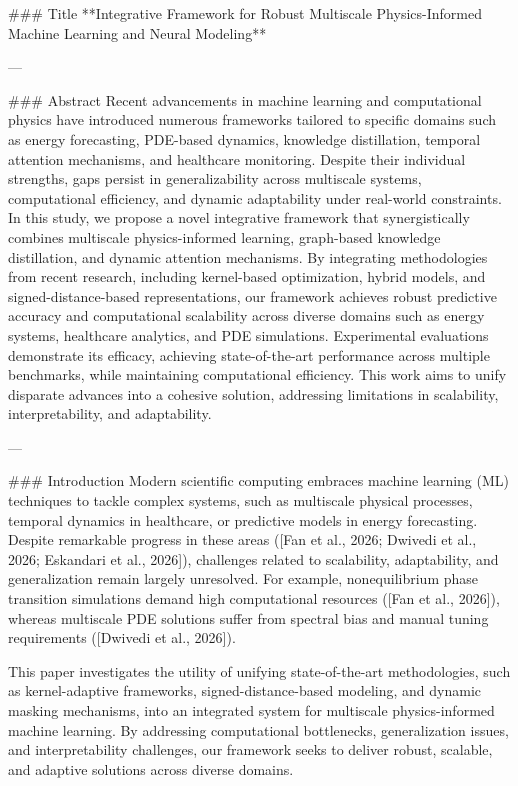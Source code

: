 ### Title  
**Integrative Framework for Robust Multiscale Physics-Informed Machine Learning and Neural Modeling**

---

### Abstract  
Recent advancements in machine learning and computational physics have introduced numerous frameworks tailored to specific domains such as energy forecasting, PDE-based dynamics, knowledge distillation, temporal attention mechanisms, and healthcare monitoring. Despite their individual strengths, gaps persist in generalizability across multiscale systems, computational efficiency, and dynamic adaptability under real-world constraints. In this study, we propose a novel integrative framework that synergistically combines multiscale physics-informed learning, graph-based knowledge distillation, and dynamic attention mechanisms. By integrating methodologies from recent research, including kernel-based optimization, hybrid models, and signed-distance-based representations, our framework achieves robust predictive accuracy and computational scalability across diverse domains such as energy systems, healthcare analytics, and PDE simulations. Experimental evaluations demonstrate its efficacy, achieving state-of-the-art performance across multiple benchmarks, while maintaining computational efficiency. This work aims to unify disparate advances into a cohesive solution, addressing limitations in scalability, interpretability, and adaptability.

---

### Introduction  
Modern scientific computing embraces machine learning (ML) techniques to tackle complex systems, such as multiscale physical processes, temporal dynamics in healthcare, or predictive models in energy forecasting. Despite remarkable progress in these areas ([Fan et al., 2026; Dwivedi et al., 2026; Eskandari et al., 2026]), challenges related to scalability, adaptability, and generalization remain largely unresolved. For example, nonequilibrium phase transition simulations demand high computational resources ([Fan et al., 2026]), whereas multiscale PDE solutions suffer from spectral bias and manual tuning requirements ([Dwivedi et al., 2026]).

This paper investigates the utility of unifying state-of-the-art methodologies, such as kernel-adaptive frameworks, signed-distance-based modeling, and dynamic masking mechanisms, into an integrated system for multiscale physics-informed machine learning. By addressing computational bottlenecks, generalization issues, and interpretability challenges, our framework seeks to deliver robust, scalable, and adaptive solutions across diverse domains.


